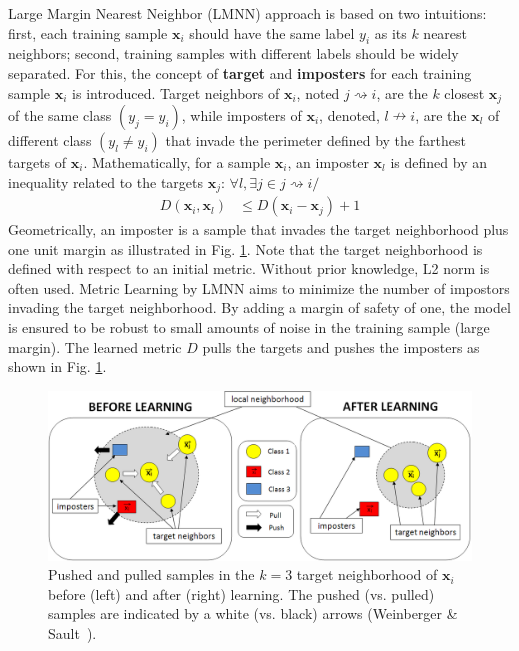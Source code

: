 Large Margin Nearest Neighbor (LMNN) approach is based on two intuitions: first, each training sample $\textbf{x}_i$ should have the same label $y_i$ as its $k$ nearest neighbors; second, training samples with different labels should be widely separated. For this, the concept of \textbf{target} and \textbf{imposters} for each training sample $\textbf{x}_i$ is introduced. Target neighbors of $\textbf{x}_i$, noted $j \rightsquigarrow i$, are the $k$ closest $\textbf{x}_j$ of the same class $(y_j=y_i)$, while imposters of $\textbf{x}_i$, denoted, $l \nrightarrow i$, are the $\textbf{x}_l$ of different class $(y_l \neq y_i)$ that invade the perimeter defined by the farthest targets of $\textbf{x}_i$. 
Mathematically, for a sample $\textbf{x}_i$, an imposter $\textbf{x}_l$ is defined by an inequality related to the targets $\textbf{x}_j$: $\forall l, \exists j \in j \rightsquigarrow i /$
\begin{align}
D(\textbf{x}_i,\textbf{x}_l) &\leq D(\textbf{x}_i-\textbf{x}_j) + 1
\end{align}
Geometrically, an imposter is a sample that invades the target neighborhood plus one unit margin as illustrated in Fig. \ref{fig:TargetImposterRepresentation}. Note that the target neighborhood is defined with respect to an initial metric. Without prior knowledge, L2 norm is often used. Metric Learning by LMNN aims to minimize the number of impostors invading the target neighborhood. By adding a margin of safety of one, the model is ensured to be robust to small amounts of noise in the training sample (large margin). The learned metric $D$ pulls the targets and pushes the imposters as shown in Fig. \ref{fig:TargetImposterRepresentation}.

\begin{figure}[h!]
	\begin{minipage}[b]{1.0\linewidth}
		\centering
		\centerline{\includegraphics[width=0.8\linewidth]{./images/TargetImposterRepresentationCao}}
	\end{minipage}
	\caption{Pushed and pulled samples in the $k=3$ target neighborhood of $\textbf{x}_i$ before (left) and after (right) learning. The pushed (vs. pulled) samples are indicated by a white (vs. black) arrows (Weinberger \& Sault~\cite{Weinberger2009}).}
	\label{fig:TargetImposterRepresentation}
\end{figure}

